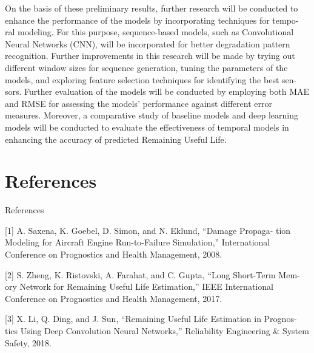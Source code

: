 \documentclass[11pt]{article}
\begin{document}
On the basis of these preliminary results, further research will be conducted to
enhance the performance of the models by incorporating techniques for tempo-
ral modeling. For this purpose, sequence-based models, such as Convolutional
Neural Networks (CNN), will be incorporated for better degradation pattern
recognition. Further improvements in this research will be made by trying out
different window sizes for sequence generation, tuning the parameters of the
models, and exploring feature selection techniques for identifying the best sen-
sors. Further evaluation of the models will be conducted by employing both
MAE and RMSE for assessing the models' performance against different error
measures. Moreover, a comparative study of baseline models and deep learning
models will be conducted to evaluate the effectiveness of temporal models in
enhancing the accuracy of predicted Remaining Useful Life.

\section{References}

References

[1] A. Saxena, K. Goebel, D. Simon, and N. Eklund, ``Damage Propaga-
tion Modeling for Aircraft Engine Run-to-Failure Simulation,'' International
Conference on Prognostics and Health Management, 2008.

[2] S. Zheng, K. Ristovski, A. Farahat, and C. Gupta, ``Long Short-Term Mem-
ory Network for Remaining Useful Life Estimation,'' IEEE International
Conference on Prognostics and Health Management, 2017.

[3] X. Li, Q. Ding, and J. Sun, ``Remaining Useful Life Estimation in Prognos-
tics Using Deep Convolution Neural Networks,'' Reliability Engineering \&
System Safety, 2018.
\end{document}
